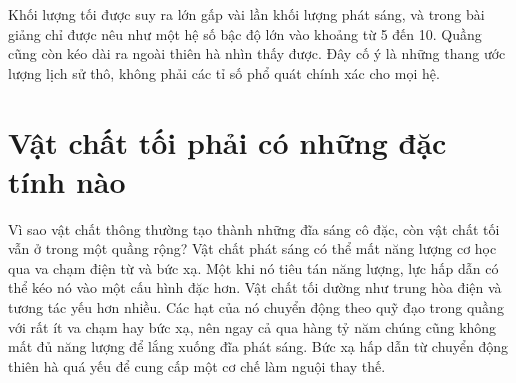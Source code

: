 \begin{classroomqa}
\end{classroomqa}

\begin{classroomqa}
\end{classroomqa}

Khối lượng tối được suy ra lớn gấp vài lần khối lượng phát sáng, và trong bài giảng chỉ được nêu như một hệ số bậc độ lớn vào khoảng từ 5 đến 10. Quầng cũng còn kéo dài ra ngoài thiên hà nhìn thấy được. Đây cố ý là những thang ước lượng lịch sử thô, không phải các tỉ số phổ quát chính xác cho mọi hệ.

\section{Vật chất tối phải có những đặc tính nào}

Vì sao vật chất thông thường tạo thành những đĩa sáng cô đặc, còn vật chất tối vẫn ở trong một quầng rộng? Vật chất phát sáng có thể mất năng lượng cơ học qua va chạm điện từ và bức xạ. Một khi nó tiêu tán năng lượng, lực hấp dẫn có thể kéo nó vào một cấu hình đặc hơn. Vật chất tối dường như trung hòa điện và tương tác yếu hơn nhiều. Các hạt của nó chuyển động theo quỹ đạo trong quầng với rất ít va chạm hay bức xạ, nên ngay cả qua hàng tỷ năm chúng cũng không mất đủ năng lượng để lắng xuống đĩa phát sáng. Bức xạ hấp dẫn từ chuyển động thiên hà quá yếu để cung cấp một cơ chế làm nguội thay thế.

